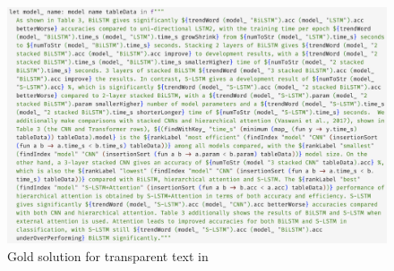 \begin{figure}%
    \small
    \includegraphics[scale=0.169]{fig/scigen-1805.02474v1-10-src-screenshot.png}
    \caption{Gold solution for transparent text in }
    \label{fig:fluid-example-paragraph}
\end{figure}
